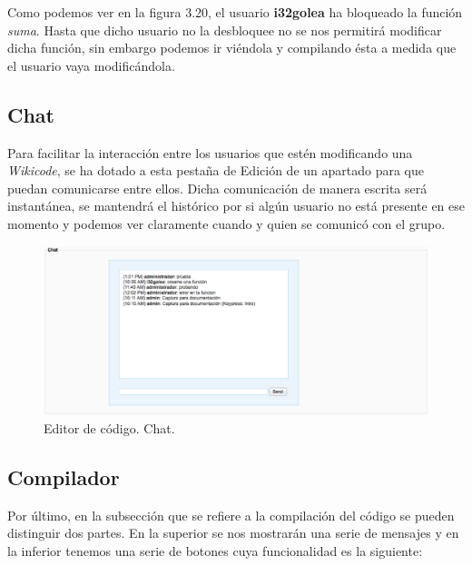 Como podemos ver en la figura 3.20, el usuario \textbf{i32golea} ha bloqueado la función \emph{suma}. Hasta que dicho usuario no la desbloquee no se nos permitirá modificar dicha función, sin embargo podemos ir viéndola y compilando ésta a medida que el usuario vaya modificándola. 

\newpage

\subsection{Chat}

Para facilitar la interacción entre los usuarios que estén modificando una \emph{Wikicode}, se ha dotado a esta pestaña de Edición de un apartado para que puedan comunicarse entre ellos. Dicha comunicación de manera escrita será instantánea, se mantendrá el histórico por si algún usuario no está presente en ese momento y podemos ver claramente cuando y quien se comunicó con el grupo.

\begin{figure}[h]
	\label{fig:echat}
	\includegraphics[width=\textwidth]{./img/echat.eps}
	\caption{Editor de código. Chat.}
\end{figure}

\newpage

\subsection{Compilador}

Por último, en la subsección que se refiere a la compilación del código se pueden distinguir dos partes. En la superior se nos mostrarán una serie de mensajes y en la inferior tenemos una serie de botones cuya funcionalidad es la siguiente:

